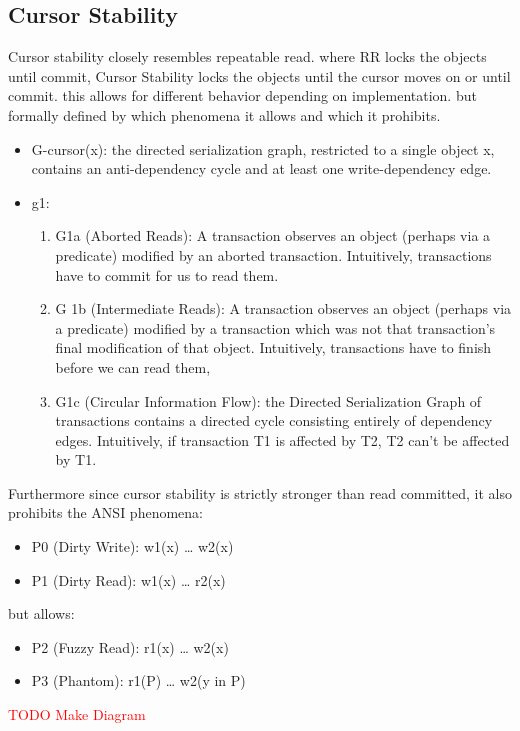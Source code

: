 \documentclass[a4paper,10pt,titlepage]{report}
\begin{document}
\subsection{Cursor Stability}
Cursor stability closely resembles repeatable read. where RR locks the objects until commit, Cursor Stability locks the objects until the cursor moves on or until commit. this allows for different behavior depending on implementation. but formally defined by which phenomena it allows and which it prohibits.
\cite{Adya99weakconsistency}\\
\begin{itemize}
\item G-cursor(x): the directed serialization graph, restricted to a single object x, contains an anti-dependency cycle and at least one write-dependency edge.
\item g1:
\begin{enumerate}
\item G1a (Aborted Reads): A transaction observes an object (perhaps via a predicate) modified by an aborted transaction. Intuitively, transactions have to commit for us to read them.
\item G 1b (Intermediate Reads): A transaction observes an object (perhaps via a predicate) modified by a transaction which was not that transaction's final modification of that object. Intuitively, transactions have to finish before we can read them,
\item G1c (Circular Information Flow): the Directed Serialization Graph of transactions contains a directed cycle consisting entirely of dependency edges. Intuitively, if transaction T1 is affected by T2, T2 can't be affected by T1.
\end{enumerate}
\end{itemize}
Furthermore since cursor stability is strictly stronger than read committed, it also prohibits the ANSI phenomena:
\begin{itemize}
\item P0 (Dirty Write): w1(x) … w2(x)
\item P1 (Dirty Read): w1(x) … r2(x)
\end{itemize}

but allows:
\begin{itemize}
\item P2 (Fuzzy Read): r1(x) … w2(x)
\item P3 (Phantom): r1(P) … w2(y in P)
\end{itemize}


\textcolor{red}{TODO Make Diagram}
\end{document}
